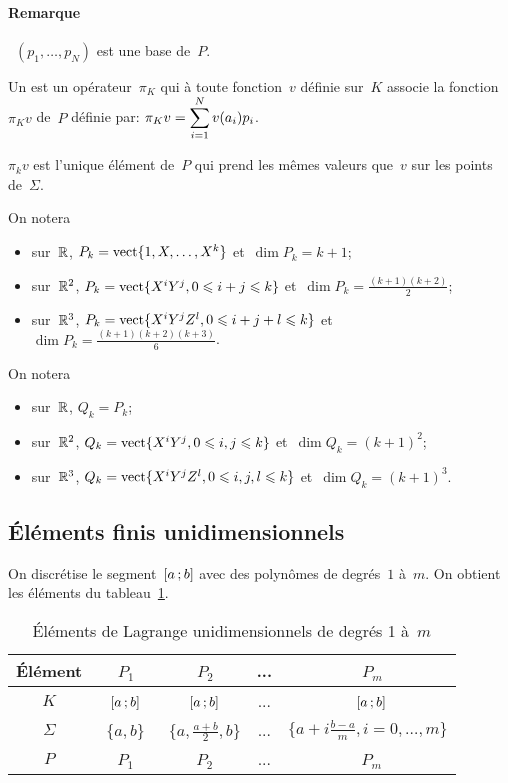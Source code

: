 \paragraph{Remarque}~$(p_1,\ldots, p_N)$ est une base de~$P$.
\medskip
\begin{definition}
Un  est un opérateur~$\pi_K$
qui à toute fonction~$v$ définie sur~$K$ associe la fonction~$\pi_Kv$ de~$P$ définie par:
$\pi_Kv=\displaystyle\sum_{i=1}^N v(a_i)p_i$.
\end{definition}
\begin{theoreme}
$\pi_kv$ est l'unique élément de~$P$ qui prend les mêmes valeurs que~$v$ sur les
points de~$\Sigma$.
\end{theoreme}
\medskip
On notera 
\begin{itemize}
\item sur~$\mathbb R$, $P_k=\operatorname{vect}\{1, X,\ldots, X^k\}$ et~$\dim P_k=k+1$;
\item sur~$\mathbb R^2$, $P_k=\operatorname{vect}\{X^iY^j, 0\leqslant i+j\leqslant k\}$ et~$\dim P_k=\frac{(k+1)(k+2)}2$;
\item sur~$\mathbb R^3$, $P_k=\operatorname{vect}\{X^iY^jZ^l, 0\leqslant i+j+l\leqslant k\}$ et~$\dim P_k=\frac{(k+1)(k+2)(k+3)}6$.
\end{itemize}
\medskip
On notera 
\begin{itemize}
\item sur~$\mathbb R$, $Q_k=P_k$;
\item sur~$\mathbb R^2$, $Q_k=\operatorname{vect}\{X^iY^j, 0\leqslant i,j\leqslant k\}$ et~$\dim Q_k=(k+1)^2$;
\item sur~$\mathbb R^3$, $Q_k=\operatorname{vect}\{X^iY^jZ^l, 0\leqslant i,j,l\leqslant k\}$ et~$\dim Q_k=(k+1)^3$.
\end{itemize}



\medskip
\subsection*{Éléments finis unidimensionnels}
On discrétise le segment~$\mathopen{[}a\,;b\mathclose{]}$ avec des polynômes de degrés~$1$ à~$m$.
On obtient les éléments du tableau~\ref{tab:Elem:uni}.
\begin{table}[ht]\centering\small
\begin{tabular}{c|cccc}
Élément &~$P_1$ &~$P_2$ & ... &~$P_m$\\
\hline
$K$	  &~$\mathopen{[}a\,;b\mathclose{]}$ &~$\mathopen{[}a\,;b\mathclose{]}$ & ... &~$\mathopen{[}a\,;b\mathclose{]}$\\
$\Sigma$ &~$\{a,b\}$ &~$\{a,\frac{a+b}2, b\}$& ... &$\{a+i\frac{b-a}m, i=0,\ldots, m\}$\\
$P$   &~$P_1$ &~$P_2$ & ... &~$P_m$\\
\hline
\end{tabular}
\caption{Éléments de Lagrange unidimensionnels de degrés 1 à~$m$}\label{tab:Elem:uni}
\end{table}

